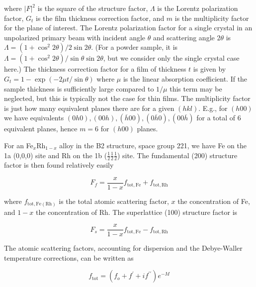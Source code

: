 \documentclass[aps,amsmath,amssymb,prb,superscriptaddress,longtable,preprint,fleqn]{revtex4}
\begin{document}
\noindent where $|F|^2$ is the square of the structure factor, $\Lambda$ is the Lorentz polarization factor,  $G_t$ is the film thickness correction factor, and $m$ is the multiplicity factor for the plane of interest. The Lorentz polarization factor for a single crystal in an unpolarized primary beam with incident angle $\theta$ and scattering angle $2\theta$ is\cite{warren69} $\Lambda \!=\! (1+\cos^2{2\theta})/2\sin{2\theta}$. (For a powder sample, it is $\Lambda \!=\! (1+\cos^2{2\theta})/\sin{\theta}\sin{2\theta}$, but we consider only the single crystal case here.) The thickness correction factor for a film of thickness $t$ is given by\cite{okamoto00} $G_t \!=\! 1 - \exp{(-2\mu t/\sin{\theta})}$ where $\mu$ is the linear absorption coefficient. If the sample thickness is sufficiently large compared to $1/\mu$ this term may be neglected, but this is typically not the case for thin films. The multiplicity factor is just how many equivalent planes there are for a given $(hkl)$. E.g., for $(h00)$ we have equivalents $(0h0),(00h),(\overline{h}00), (0\overline{h}0),(00\overline{h})$ for a total of 6 equivalent planes, hence $m=6$ for $(h00)$ planes.

For an Fe$_x$Rh$_{1-x}$ alloy in the B2 structure, space group 221, we have Fe on the 1a (0,0,0) site and Rh on the 1b ($\frac{1}{2}$$\frac{1}{2}$$\frac{1}{2}$) site. The fundamental (200) structure factor is then found relatively easily\cite{xiao94,xiao95}

\begin{equation}
F_f = \frac{x}{1-x} f_{\mathrm{tot, Fe}} + f_{\mathrm{tot, Rh}}
\end{equation}

\noindent where $f_{\mathrm{tot, Fe(Rh)}}$ is the total atomic scattering factor, $x$ the concentration of Fe, and $1\!-\!x$ the concentration of Rh. The superlattice (100) structure factor is\cite{xiao94,xiao95}

\begin{equation}
F_s = \frac{x}{1-x} f_{\mathrm{tot, Fe}} - f_{\mathrm{tot, Rh}}
\end{equation}

The atomic scattering factors, accounting for dispersion and the Debye-Waller temperature corrections, can be written as\cite{warren69,cullity01,xiao94,xiao95,lu09}

\begin{equation}
f_{\mathrm{tot}} = \left(f_o + f^\prime + if^{\prime\prime}\right)e^{-M}
\end{equation}
\end{document}
